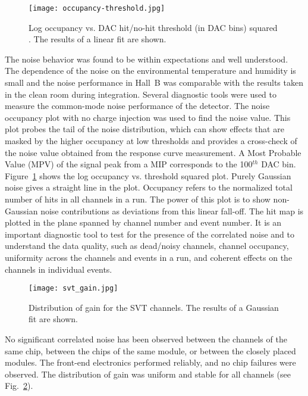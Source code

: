 \begin{figure}[hbt] 
\centering 
\texttt{[image: occupancy-threshold.jpg]}
\caption{Log occupancy vs. DAC hit/no-hit threshold (in DAC bins) squared . The results of a linear fit are shown.}
\label{fig:occupancy-threshold}
\end{figure}

The noise behavior was found to be within expectations and well understood. The dependence of the noise on the
environmental temperature and humidity is small and the noise performance in Hall~B was comparable with the
results taken in the clean room during integration. Several diagnostic tools were used to measure the
common-mode noise performance of the detector. The noise occupancy plot with no charge injection was used to find
the noise value. This plot probes the tail of the noise distribution, which can show effects that are masked by the
higher occupancy at low thresholds and provides a cross-check of the noise value obtained from the response curve
measurement. A Most Probable Value (MPV) of the signal peak from a MIP corresponds to the 100$^{th}$ DAC bin.
Figure~\ref{fig:occupancy-threshold} shows the log occupancy vs. threshold squared plot. Purely Gaussian noise
gives a straight line in the plot. Occupancy refers to the normalized total number of hits in all channels in a run.
The power of this plot is to show non-Gaussian noise contributions as deviations from this linear fall-off. The hit
map is plotted in the plane spanned by channel number and event number. It is an important diagnostic tool to test
for the presence of the correlated noise and to understand the data quality, such as dead/noisy channels, channel
occupancy, uniformity across the channels and events in a run, and coherent effects on the channels in individual
events.

\begin{figure}[hbt] 
\centering 
\texttt{[image: svt\_gain.jpg]}
\caption{Distribution of gain for the SVT channels. The results of a Gaussian fit are shown.}
\label{fig:svt_gain}
\end{figure}

No significant correlated noise has been observed between the channels of the same chip, between the chips of
the same module, or between the closely placed modules. The front-end electronics performed reliably, and no
chip failures were observed. The distribution of gain was uniform and stable for all channels (see
Fig.~\ref{fig:svt_gain}). 
 
